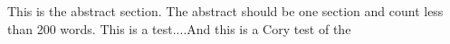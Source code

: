 This is the abstract section. The abstract should be one section and count less than 200 words. This is a test....And this is a Cory test of the 